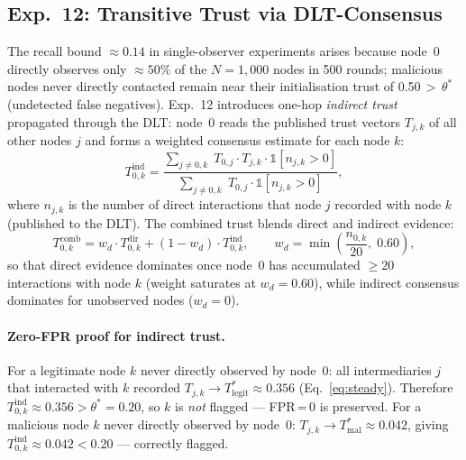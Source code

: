 \documentclass[journal,twoside,10pt]{IEEEtran}
\begin{document}
\subsection{Exp.~12: Transitive Trust via DLT-Consensus}
\label{sec:exp12}

The recall bound $\approx\!0.14$ in single-observer experiments arises
because node~0 directly observes only $\approx\!50\%$ of the $N\!=\!1{,}000$
nodes in 500 rounds; malicious nodes never directly contacted
remain near their initialisation trust of 0.50\,$>\,\theta^*$
(undetected false negatives).
Exp.~12 introduces one-hop \emph{indirect trust} propagated through the DLT:
node~0 reads the published trust vectors $T_{j,k}$ of all other nodes $j$
and forms a weighted consensus estimate for each node $k$:
\begin{equation}
  T^{\mathrm{ind}}_{0,k} =
    \frac{\displaystyle\sum_{j \neq 0,k}\; T_{0,j}\cdot T_{j,k}\cdot
          \mathbb{1}[n_{j,k}>0]}
         {\displaystyle\sum_{j \neq 0,k}\; T_{0,j}\cdot
          \mathbb{1}[n_{j,k}>0]},
  \label{eq:indirect}
\end{equation}
where $n_{j,k}$ is the number of direct interactions that node $j$
recorded with node $k$ (published to the DLT).
The combined trust blends direct and indirect evidence:
\begin{equation}
  T^{\mathrm{comb}}_{0,k} =
    w_d \cdot T^{\mathrm{dir}}_{0,k} +
    (1 - w_d) \cdot T^{\mathrm{ind}}_{0,k},
  \qquad
  w_d = \min\!\left(\frac{n_{0,k}}{20},\; 0.60\right),
  \label{eq:combined}
\end{equation}
so that direct evidence dominates once node~0 has accumulated
$\geq\!20$ interactions with node $k$ (weight saturates at $w_d\!=\!0.60$),
while indirect consensus dominates for unobserved nodes ($w_d\!=\!0$).

\paragraph{Zero-FPR proof for indirect trust.}
For a legitimate node $k$ never directly observed by node~0:
all intermediaries $j$ that interacted with $k$ recorded
$T_{j,k} \rightarrow T^*_{\mathrm{legit}} \approx 0.356$
(Eq.~\eqref{eq:steady}).
Therefore $T^{\mathrm{ind}}_{0,k} \approx 0.356 > \theta^* = 0.20$, so $k$
is \emph{not} flagged --- FPR\,=\,0 is preserved.
For a malicious node $k$ never directly observed by node~0:
$T_{j,k} \rightarrow T^*_{\mathrm{mal}} \approx 0.042$, giving
$T^{\mathrm{ind}}_{0,k} \approx 0.042 < 0.20$ --- correctly flagged.
\end{document}
